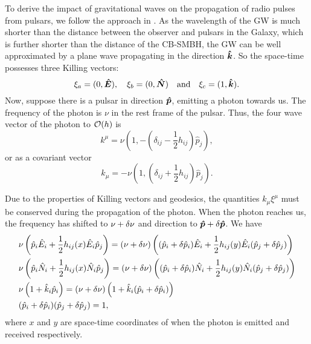 \documentclass[times,tight]{aastex631}
\begin{document}
To derive the impact of gravitational waves on the propagation of radio pulses from pulsars, we follow the approach in \citet{estabrook1975}.
As the wavelength of the GW is much shorter than the distance between the observer and pulsars in the Galaxy, which is further shorter than the distance of the CB-SMBH, the GW can be well approximated by a plane wave propagating in the direction $\vu*{k}$. 
So the space-time possesses three Killing vectors:
\begin{equation}
    \xi_a = (0, \vu*{E}) \qc \xi_b = (0, \vu*{N}) \qq{and} \xi_c = (1, \vu*{k}).
\end{equation}
Now, suppose there is a pulsar in direction $\vu*{p}$, emitting a photon towards us. 
The frequency of the photon is $\nu$ in the rest frame of the pulsar. 
Thus, the four wave vector of the photon to $\order{h}$ is
\begin{equation}
    k^{\mu} = \nu \left(1, -\left(\delta_{ij} - \frac{1}{2}h_{ij}\right)\hat{p}_j\right),
\end{equation} 
or as a covariant vector
\begin{equation}
    k_{\mu} = -\nu \left(1, \left(\delta_{ij} + \frac{1}{2}h_{ij}\right)\hat{p}_j\right).    
\end{equation}

Due to the properties of Killing vectors and geodesics, the quantities $k_{\mu}\xi^{\mu}$ must be conserved during the propagation of the photon. 
When the photon reaches us, the frequency has shifted to $\nu + \var{\nu}$ and direction to $\vu*{p} + \var{\vu*{p}}$. 
We have
\begin{align}\label{eq:Killing}
    &\nu \left(\hat{p}_i \hat{E}_i + \frac{1}{2}h_{ij}(x)\hat{E}_i\hat{p}_j\right) =  (\nu+\var{\nu}) \left((\hat{p}_i + \var{\hat{p}_i}) \hat{E}_i + \frac{1}{2}h_{ij}(y)\hat{E}_i(\hat{p}_j + \var{\hat{p}_j})\right) 
    \nonumber \\
    &\nu \left(\hat{p}_i \hat{N}_i + \frac{1}{2}h_{ij}(x)\hat{N}_i\hat{p}_j\right) =  (\nu+\var{\nu}) \left((\hat{p}_i + \var{\hat{p}_i}) \hat{N}_i + \frac{1}{2}h_{ij}(y)\hat{N}_i(\hat{p}_j + \var{\hat{p}_j})\right)
    \nonumber \\
    &\nu \left(1+\hat{k}_i\hat{p}_i\right) = (\nu+\var{\nu})\left(1+\hat{k}_i(\hat{p}_i + \var{\hat{p}_i})\right)
    \nonumber \\
    &(\hat{p}_i + \var{\hat{p}_i})(\hat{p}_j + \var{\hat{p}_j}) = 1,
\end{align}
where $x$ and $y$ are space-time coordinates of when the photon is emitted and received respectively.
\end{document}
